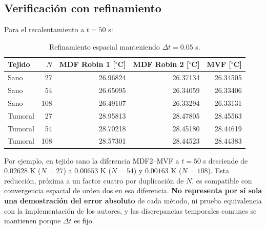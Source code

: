 \documentclass[11pt,a4paper]{article}
\begin{document}
\subsection{Verificación con refinamiento}
Para el recalentamiento a $t=50$ s:
\begin{table}[H]\centering\small
\begin{tabular}{lrrrr}\toprule
Tejido & $N$ & MDF Robin 1 [$^\circ$C] & MDF Robin 2 [$^\circ$C] & MVF [$^\circ$C]\\\midrule
Sano & 27 & 26.96824 & 26.37134 & 26.34505\\
Sano & 54 & 26.65095 & 26.34059 & 26.33406\\
Sano &108 & 26.49107 & 26.33294 & 26.33131\\
Tumoral &27 & 28.95813 & 28.47805 & 28.45563\\
Tumoral &54 & 28.70218 & 28.45180 & 28.44619\\
Tumoral &108 & 28.57301 & 28.44523 & 28.44383\\\bottomrule
\end{tabular}
\caption{Refinamiento espacial manteniendo $\Delta t=0.05$ s.}
\end{table}
Por ejemplo, en tejido sano la diferencia MDF2--MVF a $t=50$ s desciende de $0.02628$ K ($N=27$) a $0.00653$ K ($N=54$) y $0.00163$ K ($N=108$). Esta reducción, próxima a un factor cuatro por duplicación de $N$, es compatible con convergencia espacial de orden dos en esa diferencia. \textbf{No representa por sí sola una demostración del error absoluto} de cada método, ni prueba equivalencia con la implementación de los autores, y las discrepancias temporales comunes se mantienen porque $\Delta t$ es fijo.
\end{document}
